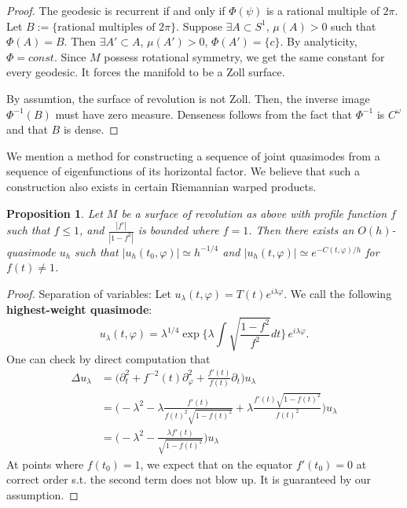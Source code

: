 \documentclass[12pt,reqno]{amsart}
\renewcommand{\phi}{\varphi}
\newtheorem{prop}[cor]{{\sc Proposition}}
\numberwithin{equation}{section}
\begin{document}
\begin{proof}
The geodesic is recurrent if and only if $\Phi(\psi)$ is a rational multiple of $2\pi$. Let $B:=\{\text{rational multiples of }2\pi\}$. Suppose $\exists A\subset S^1,\, \mu(A)>0$ such that $\Phi(A)= B$. Then $\exists A'\subset A$, $\mu(A')>0$, $\Phi(A')=\{c\}$. By analyticity, $\Phi=const.$ Since $M$ possess rotational symmetry, we get the same constant for every geodesic. It forces the manifold to be a Zoll surface.

By assumtion, the surface of revolution is not Zoll. Then, the inverse image $\Phi^{-1}(B)$ must have zero measure. Denseness follows from the fact that $\Phi^{-1}$ is $C^{\omega}$ and that $B$ is dense.

\end{proof}


We mention a method for constructing a sequence of joint quasimodes from a sequence of eigenfunctions of its horizontal factor. We believe that such a construction also exists in certain Riemannian warped products. 


\begin{prop}\label{SOR quasi}
    Let $M$ be a surface of revolution as above with profile function $f$ such that $f\leq 1$, and $\frac{|f'|}{|1-f^2|}$ is bounded where $f=1$. Then there exists an $O(h)$-quasimode $u_h$ such that $|u_h(t_0,\phi)|\simeq h^{-1/4}$ and $|u_h(t,\phi)|\simeq  e^{-C(t,\phi)/h}$ for $f(t)\neq 1$. 
\end{prop}
\begin{proof}
    Separation of variables: Let $u_{\lambda}(t,\phi)=T(t)e^{i\lambda\phi}$. We call the following \textbf{highest-weight quasimode}: 
\begin{equation}\label{trial}
    u_{\lambda}(t,\phi)=\lambda^{1/4}\exp\{\lambda\int\sqrt{\frac{1-f^2}{f^2}}dt\}\,e^{i\lambda \phi}.
\end{equation}
One can check by direct computation that 
\begin{align}
\Delta u_{\lambda}&=\Big(\partial_t^2+f^{-2}(t)\partial_\phi^2+\frac{f'(t)}{f(t)}\partial_t\Big)u_{\lambda} \nonumber\\
&=\Big(-\lambda^2-\lambda\frac{f'(t)}{f(t)^2\sqrt{1-f(t)^2}}+\lambda\frac{f'(t)\sqrt{1-f(t)^2}}{f(t)^2}\Big)u_{\lambda}\nonumber\\
&=\Big(-\lambda^2-\frac{\lambda f'(t)}{\sqrt{1-f(t)^2}}\Big)u_{\lambda}
\end{align}
At points where $f(t_0)=1$, we expect that on the equator $f'(t_0)=0$ at correct order s.t. the second term does not blow up. It is guaranteed by our assumption.

\end{proof}
\end{document}
